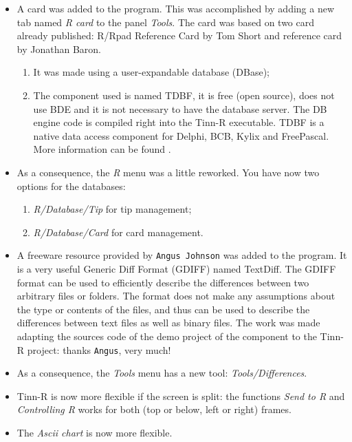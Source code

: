 \begin{itemize}
  \item A \RR{} card was added to the program.
    This was accomplished by adding a new tab
    named \textit{R card} to the panel \textit{Tools}.
    The \RR{} card was based on two \RR{} card already published:
    R/Rpad Reference Card by Tom Short and \RR{} reference card by Jonathan Baron.
    \begin{enumerate}
      \item It was made using a user-expandable database (DBase);
      \item The component used is named TDBF, it is free (open source), does
        not use BDE and it is not necessary to have the database server. The
        DB engine code is compiled right into the Tinn-R executable. TDBF is
        a native data access component for Delphi, BCB, Kylix and FreePascal.
        More information can be found
        .
    \end{enumerate}
  \item As a consequence, the \textit{R} menu was a little reworked. You
    have now two options for the databases:
    \begin{enumerate}
      \item \textit{R/Database/Tip} for tip management;
      \item \textit{R/Database/Card} for \RR{} card management.
    \end{enumerate}
  \item A freeware resource provided by \texttt{Angus Johnson} was added
    to the program. It is a very useful Generic Diff Format (GDIFF)
    named TextDiff. The GDIFF format can be used to efficiently describe
    the differences between two arbitrary files or folders. The format
    does not make any assumptions about the type or contents of the files,
    and thus can be used to describe the differences between text files
    as well as binary files. The work was made adapting the sources code
    of the demo project of the component to the Tinn-R project: thanks
    \texttt{Angus}, very much!
  \item As a consequence, the \textit{Tools} menu has a new tool:
    \textit{Tools/Differences}.
  \item Tinn-R is now more flexible if the screen is split: the
    functions \textit{Send to R} and \textit{Controlling R} works for
    both (top or below, left or right) frames.
  \item The \textit{Ascii chart} is now more flexible.

\end{itemize}
